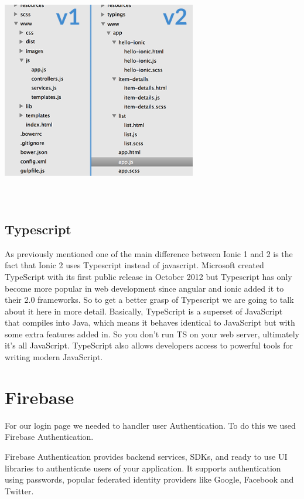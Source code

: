  \begin{center}    
	\includegraphics[width=8.5cm, height=10cm]{img/structure-v1-v2.png}
\end{center}

\subsection {Typescript}
As previously mentioned one of the main difference between Ionic 1 and 2 is the fact that Ionic 2 uses Typescript instead of javascript. Microsoft created TypeScript with its first public release in October 2012 but Typescript has only become more popular in web development since angular and ionic added it to their 2.0 frameworks. So to get a better grasp of Typescript we are going to talk about it here in more detail.
Basically, TypeScript is a superset of JavaScript that compiles into Java, which means it behaves identical to JavaScript but with some extra features added in. So you don't run TS on your web server, ultimately it’s all JavaScript. TypeScript also allows developers access to powerful tools for writing modern JavaScript.\cite{typescript} \cite{typescript2}
\section{Firebase}
For our login page we needed to handler user Authentication. To do this we used Firebase Authentication. 

Firebase Authentication provides backend services, SDKs, and ready to use UI libraries to authenticate users of your application. It supports authentication using passwords, popular federated identity providers like Google, Facebook and Twitter.\cite{firebaseauth}

